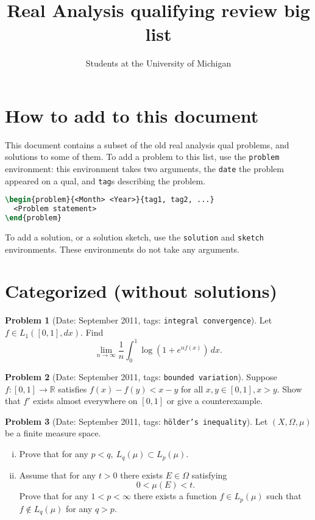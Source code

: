 \documentclass[11pt, notitlepage]{article}
\title{Real Analysis qualifying review big list}
\author{Students at the University of Michigan}
\theoremstyle{definition}
\theoremstyle{definition}
\theoremstyle{definition}
\newtheorem{probstate}{Problem}
\theoremstyle{remark}
\newenvironment{problem}[2]{
    \begin{probstate}[Date: #1, tags: \texttt{#2}]
}
{
  \end{probstate}
}
\newcommand{\R}{\mathbb{R}}
\begin{document}
\maketitle


\section*{How to add to this document}
This document contains a subset of the old real analysis qual problems, and solutions to some of them.
To add a problem to this list, use the \texttt{problem} environment: this environment takes two arguments, the \texttt{date} the problem appeared on a qual, and \texttt{tag}s describing the problem.
\begin{lstlisting}[language=TeX]
\begin{problem}{<Month> <Year>}{tag1, tag2, ...}
  <Problem statement>
\end{problem}
\end{lstlisting}

To add a solution, or a solution sketch, use the \texttt{solution} and \texttt{sketch} environments.
These environments do not take any arguments.

\section{Categorized (without solutions)}

\begin{problem}{September 2011}{integral convergence}
Let $f \in L_1([0,1], dx)$. Find
 \[
   \lim_{n \to \infty} \frac{1}{n}  \int_0^1 \log \left( 1+ e^{nf(x)} \right) \, dx.
 \]
\end{problem}

\begin{problem}{September 2011}{bounded variation}
  Suppose $f:[0,1] \to \R$ satisfies $f(x)-f(y)<x-y$ for all $x,y\in [0,1], x>y$.
  Show that $f'$ exists almost everywhere on $[0,1]$ or give a counterexample.
\end{problem}

\begin{problem}{September 2011}{hölder's inequality}
  Let $(X,\Omega, \mu)$ be a finite measure space.
 \begin{enumerate}[(i)]
   \item Prove that for any $p<q, \ L_q(\mu) \subset L_p(\mu)$.
   \item Assume that for any
 $t>0$ there exists $E \in \Omega$ satisfying
 \[
  0< \mu(E) <t.
 \]
 Prove that for any $1<p< \infty$ there exists a function $f \in
 L_p(\mu)$ such that $f \notin L_q(\mu)$ for any $q>p$.
\end{enumerate}
\end{problem}
\end{document}
